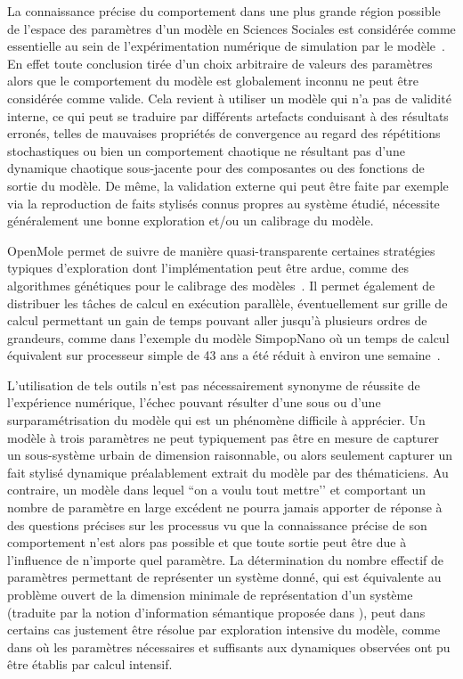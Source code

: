\documentclass[french,12pt]{article}
\begin{document}
\bigskip

La connaissance précise du comportement dans une plus grande région possible de l’espace des paramètres d’un modèle en Sciences Sociales est considérée comme essentielle au sein de l’expérimentation numérique de simulation par le modèle~\cite{banos2013HDR}. En effet toute conclusion tirée d’un choix arbitraire de valeurs des paramètres alors que le comportement du modèle est globalement inconnu ne peut être considérée comme valide. Cela revient à utiliser un modèle qui n’a pas de validité interne, ce qui peut se traduire par différents artefacts conduisant à des résultats erronés, telles de mauvaises propriétés de convergence au regard des répétitions stochastiques ou bien un comportement chaotique ne résultant pas d’une dynamique chaotique sous-jacente pour des composantes ou des fonctions de sortie du modèle. De même, la validation externe qui peut être faite par exemple via la reproduction de faits stylisés connus propres au système étudié, nécessite généralement une bonne exploration et/ou un calibrage du modèle.

\bigskip

OpenMole permet de suivre de manière quasi-transparente certaines stratégies typiques d’exploration dont l’implémentation peut être ardue, comme des algorithmes génétiques pour le calibrage des modèles~\cite{reuillon2012algorithmes}. Il permet également de distribuer les tâches de calcul en exécution parallèle, éventuellement sur grille de calcul permettant un gain de temps pouvant aller jusqu’à plusieurs ordres de grandeurs, comme dans l’exemple du modèle SimpopNano où un temps de calcul équivalent sur processeur simple de 43 ans a été réduit à environ une semaine~\cite{schmitt2014half}.%

\bigskip

L’utilisation de tels outils n’est pas nécessairement synonyme de réussite de l’expérience numérique, l’échec pouvant résulter d’une sous ou d’une surparamétrisation du modèle qui est un phénomène difficile à apprécier. Un modèle à trois paramètres ne peut typiquement pas être en mesure de capturer un sous-système urbain de dimension raisonnable, ou alors seulement capturer un fait stylisé dynamique préalablement extrait du modèle par des thématiciens. Au contraire, un modèle dans lequel ``on a voulu tout mettre’’ et comportant un nombre de paramètre en large excédent ne pourra jamais apporter de réponse à des questions précises sur les processus vu que la connaissance précise de son comportement n’est alors pas possible et que toute sortie peut être due à l’influence de n’importe quel paramètre. La détermination du nombre effectif de paramètres permettant de représenter un système donné, qui est équivalente au problème ouvert de la dimension minimale de représentation d’un système (traduite par la notion d’information sémantique proposée dans \cite{haken2003face}), peut dans certains cas justement être résolue par exploration intensive du modèle, comme dans \cite{schmitt2014half} où les paramètres nécessaires et suffisants aux dynamiques observées ont pu être établis par calcul intensif.
\end{document}

